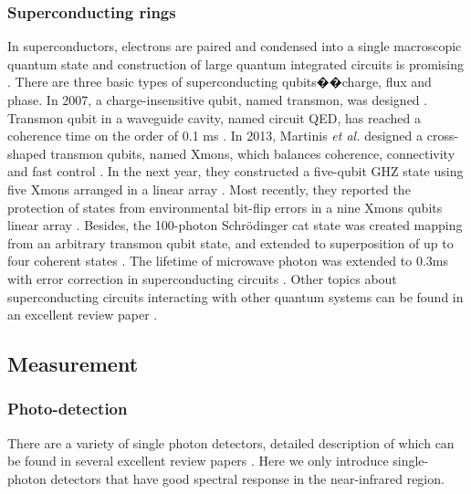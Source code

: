 \documentclass[aps,rmp,twocolumn,amsmath,amssymb,nofootinbib,superscriptaddress,longbibliography,floatfix,table-of-contents,eqsecnum]{revtex4-1}
\begin{document}
%
%

\subsubsection{Superconducting rings} 

In superconductors, electrons are paired and condensed into a single macroscopic quantum state and construction of large quantum integrated circuits is promising \cite{devoret2013superconducting}. There are three basic types of superconducting qubits��charge, flux and phase. In 2007, a charge-insensitive qubit, named transmon, was designed \cite{koch2007charge}. Transmon qubit in a waveguide cavity, named circuit QED, has reached a coherence time on the order of 0.1 ms \cite{paik2011observation, rigetti2012superconducting}. In 2013, Martinis \textit{et al.} designed a cross-shaped transmon qubits, named Xmons, which balances coherence, connectivity and fast control \cite{barends2013coherent}. In the next year, they constructed a five-qubit GHZ state using five Xmons arranged in a linear array \cite{barends2014superconducting}. Most recently, they reported the protection of states from environmental bit-flip errors in a nine Xmons qubits linear array \cite{kelly2015state}. Besides, the 100-photon Schr{\"o}dinger cat state was created mapping from an arbitrary transmon qubit state, and extended to superposition of up to four coherent states \cite{vlastakis2013deterministically}. The lifetime of microwave photon was extended to 0.3ms with error correction in superconducting circuits \cite{ofek2016extending}. Other topics about superconducting circuits interacting with other quantum systems can be found in an excellent review paper \cite{xiang2013hybrid}.

%
%

\subsection{Measurement} 

%
%

\subsubsection{Photo-detection} 

There are a variety of single photon detectors, detailed description of which can be found in several excellent review papers \cite{eisaman2011, hadfield2009}. Here we only introduce single-photon detectors that have good spectral response in the near-infrared region.
\end{document}
